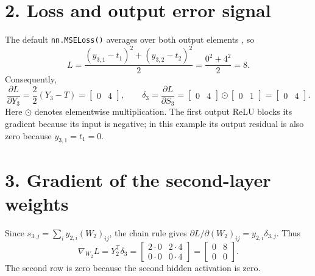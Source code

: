 \documentclass[11pt]{article}
\begin{document}
\section*{2. Loss and output error signal}
The default \texttt{nn.MSELoss()} averages over both output elements
\cite{mse}, so
\[
L=\frac{(y_{3,1}-t_1)^2+(y_{3,2}-t_2)^2}{2}
 =\frac{0^2+4^2}{2}=8.
\]
Consequently,
\[
\frac{\partial L}{\partial Y_3}
 =\frac{2}{2}(Y_3-T)=\begin{bmatrix}0&4\end{bmatrix},\qquad
\delta_3=\frac{\partial L}{\partial S_3}
 =\begin{bmatrix}0&4\end{bmatrix}\odot\begin{bmatrix}0&1\end{bmatrix}
 =\begin{bmatrix}0&4\end{bmatrix}.
\]
Here $\odot$ denotes elementwise multiplication. The first output ReLU
blocks its gradient because its input is negative; in this example its
output residual is also zero because $y_{3,1}=t_1=0$.

\section*{3. Gradient of the second-layer weights}
Since $s_{3,j}=\sum_i y_{2,i}(W_2)_{ij}$, the chain rule gives
$\partial L/\partial(W_2)_{ij}=y_{2,i}\delta_{3,j}$. Thus
\[
\boxed{\nabla_{W_2}L=Y_2^{\mathsf T}\delta_3
 =\begin{bmatrix}2\cdot0&2\cdot4\\0\cdot0&0\cdot4\end{bmatrix}
 =\begin{bmatrix}0&8\\0&0\end{bmatrix}.}
\]
The second row is zero because the second hidden activation is zero.

\newpage
\end{document}

